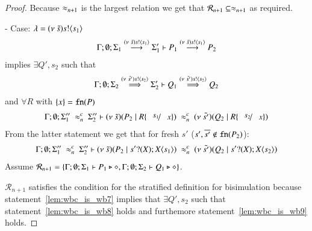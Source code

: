 \begin{proof}
	\noi Because $\approx_{n+1}$ is the largest relation we get that $\mathcal{R}_{n+1} \subseteq \approx_{n+1}$ as required.



	\noi - Case: $\lambda = (\nu\ \tilde{s}) s ! \langle s_1 \rangle$
%
	\begin{eqnarray}
		\Gamma; \emptyset; \Sigma_1 \stackrel{(\nu\ \tilde{s}) s ! \langle s_1 \rangle}{\longrightarrow} \Sigma_1' \vdash P_1 \stackrel{(\nu\ \tilde{s}) s ! \langle s_1 \rangle}{\longrightarrow} P_2 \label{lem:wbc_is_wb7}
	\end{eqnarray}
%
	implies $\exists Q', s_2$ such that
	\begin{eqnarray}
		\Gamma; \emptyset; \Sigma_2 \stackrel{(\nu\ \tilde{s'}) s ! \langle s_2 \rangle}{\Longrightarrow} \Sigma_2' \vdash Q_1 \stackrel{(\nu\ \tilde{s'}) s ! \langle s_2 \rangle}{\Longrightarrow} Q_2 \label{lem:wbc_is_wb8}
	\end{eqnarray}
	and $\forall R$ with $\{x\} = \mathtt{fn}(P)$
%
	\begin{eqnarray*}
		\Gamma; \emptyset; \Sigma_1''\ \wbc_{n}\ \Sigma_2'' \proves \newsp{\tilde{s}}{P_2 \Par R \subst{s_1}{x}}\ \wbc_{n}\ 
		\newsp{\tilde{s'}}{Q_2 \Par R \subst{s_2}{x}}
	\end{eqnarray*}
%
	\noi From the latter statement we get that for fresh $s'$ ($s', \overline{s'} \notin \mathtt{fn}(P_2)$):
	\begin{eqnarray*}
		\Gamma; \emptyset; \Sigma_1''\ \wbc_{n}\ \Sigma_2'' \proves \newsp{\tilde{s}}{P_2 \Par \binp{s'}{X} \appl{X}{s_1}}\ \wbc_{n}\ 
		\newsp{\tilde{s'}}{Q_2 \Par \binp{s'}{X} \appl{X}{s_2}} \label{lem:wbc_is_wb9}
	\end{eqnarray*}
%
	\noi Assume $\mathcal{R}_{n+1} = \{\Gamma; \emptyset; \Sigma_1 \vdash P_1 \triangleright \diamond, \Gamma; \emptyset; \Sigma_2 \vdash Q_1 \triangleright \diamond\}$.

	\noi $\mathcal{R}_{n+1}$ satisfies the condition for the stratified definition for bisimulation
	because statement~\ref{lem:wbc_is_wb7} implies that
	$\exists Q', s_2$ such that
	statement~\ref{lem:wbc_is_wb8} holds and furthemore statement~\ref{lem:wbc_is_wb9} holds.
\end{proof}

